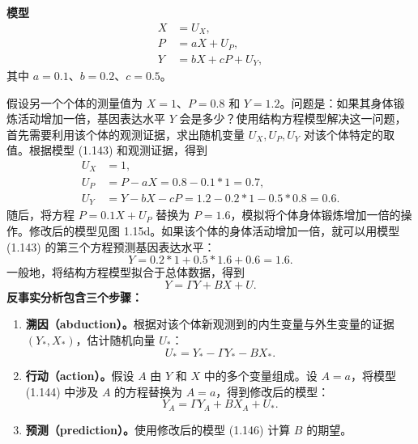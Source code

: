 \noindent\textbf{模型}
\begin{equation}
\begin{aligned}
X&=U_X,\\
P&=aX+U_P,\\
Y&=bX+cP+U_Y,
\end{aligned}
\tag{1.143}
\end{equation}
其中 $a=0.1$、$b=0.2$、$c=0.5$。

假设另一个个体的测量值为 $X=1$、$P=0.8$ 和 $Y=1.2$。问题是：如果其身体锻炼活动增加一倍，基因表达水平 $Y$ 会是多少？使用结构方程模型解决这一问题，首先需要利用该个体的观测证据，求出随机变量 $U_X,U_P,U_Y$ 对该个体特定的取值。根据模型 (1.143) 和观测证据，得到
\[
\begin{aligned}
U_X&=1,\\
U_P&=P-aX=0.8-0.1*1=0.7,\\
U_Y&=Y-bX-cP=1.2-0.2*1-0.5*0.8=0.6.
\end{aligned}
\]
随后，将方程 $P=0.1X+U_P$ 替换为 $P=1.6$，模拟将个体身体锻炼增加一倍的操作。修改后的模型见图 1.15d。如果该个体的身体活动增加一倍，就可以用模型 (1.143) 的第三个方程预测基因表达水平：
\[
Y=0.2*1+0.5*1.6+0.6=1.6.
\]
一般地，将结构方程模型拟合于总体数据，得到
\begin{equation}
Y=\Gamma Y+BX+U.
\tag{1.144}
\end{equation}
\textbf{反事实分析包含三个步骤：}
\begin{enumerate}
\item \textbf{溯因（abduction）。}根据对该个体新观测到的内生变量与外生变量的证据 $(Y_*,X_*)$，估计随机向量 $U_*$：
\begin{equation}
U_*=Y_*-\Gamma Y_*-BX_*.
\tag{1.145}
\end{equation}
\item \textbf{行动（action）。}假设 $A$ 由 $Y$ 和 $X$ 中的多个变量组成。设 $A=a$，将模型 (1.144) 中涉及 $A$ 的方程替换为 $A=a$，得到修改后的模型：
\begin{equation}
Y_A=\Gamma Y_A+BX_A+U_*.
\tag{1.146}
\end{equation}
\item \textbf{预测（prediction）。}使用修改后的模型 (1.146) 计算 $B$ 的期望。
\end{enumerate}
\FloatBarrier
